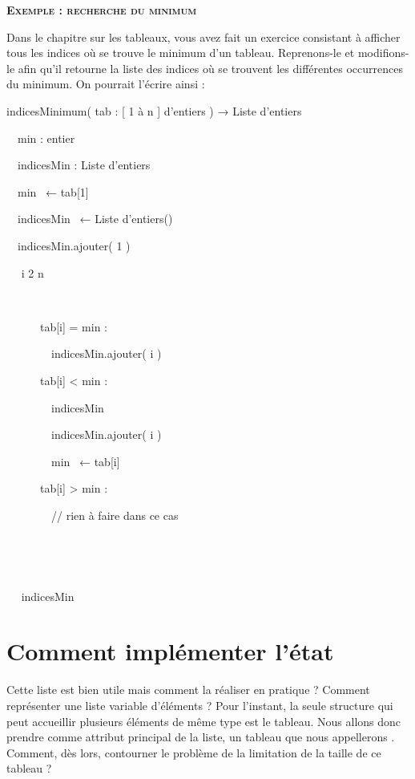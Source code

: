 \bigskip

{\sffamily\bfseries\scshape
Exemple : recherche du minimum}

{
Dans le chapitre sur les tableaux, vous avez fait un exercice consistant
à afficher tous les indices où se trouve le minimum d’un tableau.
Reprenons-le et modifions-le afin qu’il retourne la liste des indices
où se trouvent les différentes occurrences du minimum. On pourrait
l’écrire ainsi :}

{\sffamily
{} indicesMinimum( tab :  [
1 à n ] d’entiers ) → Liste d’entiers}

{\sffamily
\ \ min : entier\ \ \ \ }

{\sffamily
\ \ indicesMin : Liste d’entiers}

{\sffamily
\ \ min~\textrm{ }← tab[1]}

{\sffamily
\ \ indicesMin~\textrm{ }←  Liste d’entiers()}

{\sffamily
\ \ indicesMin.ajouter( 1 )}

{\sffamily
\ \  i  2  n
}

{\sffamily
\ \ \ \  }

{\sffamily
\ \ \ \ \ \ tab[i] = min : \ \ \ \ }

{\sffamily
\ \ \ \ \ \ \ \ indicesMin{.ajouter( i )}}

{\sffamily
\ \ \ \ \ \ tab[i] {\textless} min : \ \ \ \ }

{\sffamily
{\ \ \ \ \ \ \ \ indicesMin}}

{\sffamily
\ \ \ \ \ \ \ \ indicesMin.ajouter( i )}

{\sffamily
\ \ \ \ \ \ \ \ min~\textrm{ }← tab[i]}

{\sffamily
\ \ \ \ \ \ tab[i] {\textgreater} min : }

{\sffamily
{\ \ \ \ \ \ \ \ }{//
rien à faire dans ce cas\ \ }}

{\sffamily
{\ \ \ \ }
}

{\sffamily
\ \  }

{\sffamily
\ \  indicesMin~ \ \ \ \ }

{\sffamily
{} }


\bigskip

\section{Comment implémenter l’état}
{
Cette liste est bien utile mais comment la réaliser en pratique ?
Comment représenter une liste variable d’éléments ? Pour
l'instant, la seule structure qui peut accueillir
plusieurs éléments de même type est le tableau. Nous allons donc
prendre comme attribut principal de la liste, un tableau que nous
appellerons . Comment, dès lors, contourner
le problème de la limitation de la taille de ce tableau ?}

